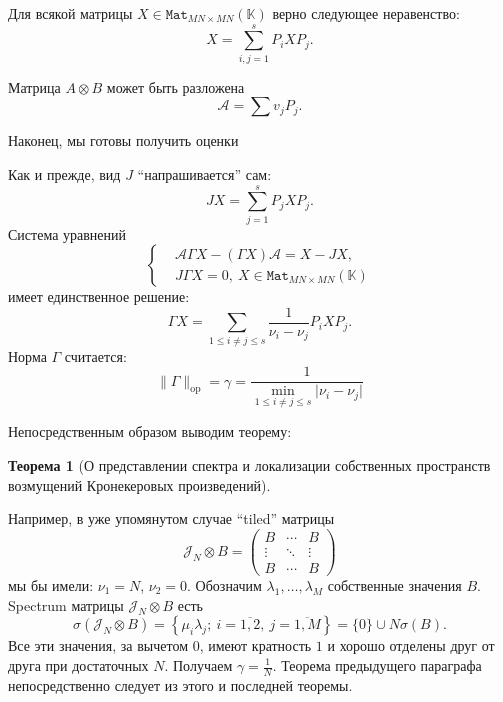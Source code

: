 \documentclass[14pt,a4paper]{extarticle}
\numberwithin{equation}{section}
\newtheorem{thm}{Теорема}
\theoremstyle{definition}
\begin{document}
Для всякой матрицы \( X\in \mathtt{Mat}_{MN{\times}MN}(\mathbb{K}) \)
верно следующее неравенство:
    \[
        X = \sum_{i,j=1}^s P_i X P_j.
    \]

Матрица \( A\otimes B \) может быть разложена
    \[
        \mathcal{A} = \sum v_j P_j.
    \]

Наконец, мы готовы получить оценки

Как и прежде, вид \( J \) ``напрашивается'' сам:
    \[
        JX = \sum_{j=1}^s P_j X P_j.
    \]
Система уравнений
    \[\left\{\begin{aligned}
        & \mathcal{A}\Gamma X - (\Gamma X) \mathcal{A} = X - JX, \\
        & J\Gamma X = 0,\ X\in \mathtt{Mat}_{MN{\times}MN}(\mathbb{K})
    \end{aligned}\right.\]
имеет единственное решение:
    \[
        \Gamma X = \sum_{1\leq i{\neq}j \leq s} \frac{1}{\nu_i-\nu_j} P_i X P_j.
    \]
Норма \( \Gamma \) считается:
    \[
        \|\Gamma\|_{\mathrm{op}} = \gamma = \frac{1}{\min_{1\leq i{\neq}j\leq s}\lvert\nu_i - \nu_j\rvert}
    \]

Непосредственным образом выводим теорему:

\begin{thm}[О представлении спектра и локализации собственных пространств
  возмущений Кронекеровых произведений]\label{nk:thm:kron}
  
\end{thm}

Например, в уже упомянутом случае ``tiled'' матрицы
\[
    \mathcal{J}_N{\otimes}B =
    \begin{pmatrix}
        B & \cdots & B \\
        \vdots & \ddots & \vdots \\
        B & \cdots & B
    \end{pmatrix}
\]
мы бы имели:
    \( \nu_1=N \),
    \( \nu_2=0 \).
Обозначим \( \lambda_1,\ldots,\lambda_M \)
    собственные значения \( B \).
Spectrum матрицы \( \mathcal{J}_N{\otimes}B \) есть
    \[
        \sigma(\mathcal{J}_N{\otimes}B) = \left\{ \mu_i\lambda_j;\ i{=}\overline{1,2},\ j{=}\overline{1,M}\right\} = \{0\}\cup N\sigma(B).
    \]
Все эти значения, за вычетом \( 0 \),
    имеют кратность \( 1 \)
    и хорошо отделены друг от друга при достаточных \( N \).
Получаем \( \gamma=\frac1N \).
Теорема предыдущего параграфа непосредственно следует из этого и последней теоремы.
\end{document}
